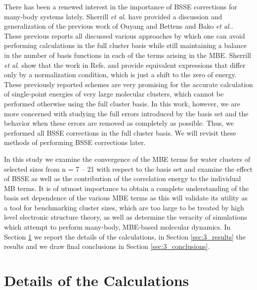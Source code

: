\documentclass[11pt, proquest]{uwthesis}[2020/02/24]
\begin{document}
\par There has been a renewed interest in the importance of BSSE corrections for many-body systems lately. Sherrill \textit{et al.}\autocite{richard_understanding_2018} have provided a discussion and generalization of the previous work of Ouyang and Bettens\autocite{ouyang_many-body_2015} and Bako \textit{et al.}\autocite{mayer_many-body_2017}. These previous reports all discussed various approaches by which one can avoid performing calculations in the full cluster basis while still maintaining a balance in the number of basis functions in each of the terms arising in the MBE. Sherrill \textit{et al}. show that the work in Refs. \cite{ouyang_many-body_2015} and \cite{mayer_many-body_2017} provide equivalent expressions that differ only by a normalization condition, which is just a shift to the zero of energy. These previously reported schemes are very promising for the accurate calculation of single-point energies of very large molecular clusters, which cannot be performed otherwise using the full cluster basis. In this work, however, we are more concerned with studying the full errors introduced by the basis set and the behavior when these errors are removed as completely as possible. Thus, we performed all BSSE corrections in the full cluster basis. We will revisit these methods of performing BSSE corrections later. 
\par In this study we examine the convergence of the MBE terms for water clusters of selected sizes from n = 7 – 21 with respect to the basis set and examine the effect of BSSE as well as the contribution of the correlation energy to the individual MB terms. It is of utmost importance to obtain a complete understanding of the basis set dependence of the various MBE terms as this will validate its utility as a tool for benchmarking cluster sizes, which are too large to be treated by high level electronic structure theory,\autocite{richard_aiming_2014} as well as determine the veracity of simulations which attempt to perform many-body, MBE-based molecular dynamics.\autocite{liu_hydrogen-bond_2018} In Section \ref{sec:3_details} we report the details of the calculations, in Section \ref{sec:3_results} the results and we draw final conclusions in Section \ref{sec:3_conclusions}.

\section{Details of the Calculations}\label{sec:3_details}
\end{document}
